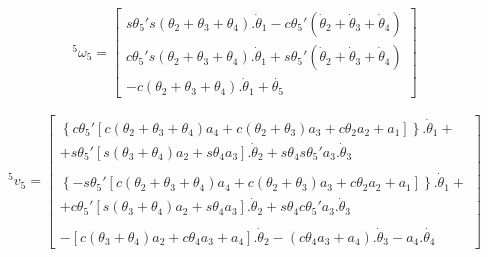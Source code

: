\begin{equation}
    ^5\omega_5 = \begin{bmatrix}
                    s\theta_5's(\theta_2+\theta_3+\theta_4).\dot{\theta}_1 - c\theta_5'(\dot{\theta}_2 + \dot{\theta}_3 + \dot{\theta}_4) \\
                    c\theta_5's(\theta_2+\theta_3+\theta_4).\dot{\theta}_1 + s\theta_5'(\dot{\theta}_2 + \dot{\theta}_3 + \dot{\theta}_4) \\ 
                    -c(\theta_2+\theta_3+\theta_4).\dot{\theta}_1 + \dot{\theta_5}
                \end{bmatrix}
\end{equation}

\begin{equation}
    \begin{gathered}
        ^5v_5 = \begin{bmatrix}
            \left\{c\theta_5'[c(\theta_2 + \theta_3 + \theta_4)a_4 + c(\theta_2 + \theta_3)a_3 + c\theta_2a_2 + a_1]\right\}.\dot{\theta}_1 + \\
            + s\theta_5'[s(\theta_3+\theta_4)a_2 + s\theta_4a_3].\dot{\theta}_2 + s\theta_4s\theta_5'a_3.\dot{\theta}_3 \\ 
            \\
            \left\{-s\theta_5'[c(\theta_2 + \theta_3 + \theta_4)a_4 + c(\theta_2 + \theta_3)a_3 + c\theta_2a_2 + a_1]\right\}.\dot{\theta}_1 + \\
            + c\theta_5'[s(\theta_3+\theta_4)a_2 + s\theta_4a_3].\dot{\theta}_2 + s\theta_4c\theta_5'a_3.\dot{\theta}_3 \\ 
            \\
            -[c(\theta_3+\theta_4)a_2 + c\theta_4a_3 + a_4].\dot{\theta}_2 - (c\theta_4a_3 + a_4).\dot{\theta}_3 - a_4.\dot{\theta_4}
        \end{bmatrix}
    \end{gathered}
\end{equation}


